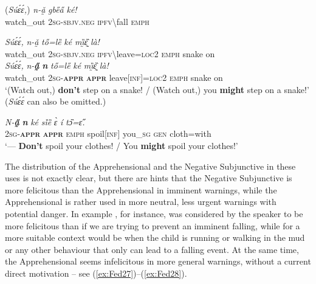 \documentclass[output=paper,colorlinks,citecolor=brown
]{langscibook}
\begin{document}
\ea \label{ex:Fed24}
\ea \label{ex:Fed24a}
\gll \textup{(}\textit{Súɛ́ɛ́,}\textup{)} \textit{n-ǎ̰} \textit{gbe̋a̋} \textit{ké!} \\
watch\_out \textsc{2sg-sbjv.neg} \textsc{ipfv}\backslash fall \textsc{emph} \\
\z
\z


\ea \label{ex:Fed25}
\ea \label{ex:Fed25a}
\gll \textit{Súɛ́ɛ́,} \textit{n-ǎ̰} \textit{tő=lȅ} \textit{ké} \textit{mı̰̏ɛ̰̏} \textit{là!} \\
watch\_out \textsc{2sg-sbjv.neg} \textsc{ipfv}\backslash leave=\textsc{loc2} \textsc{emph} snake on \\
\ex \label{ex:Fed25b}
\gll \textit{Súɛ́ɛ́,} \textit{n-\textbf{a̰̋}} \textit{\textbf{n{\ù}}} \textit{tő=le̋} \textit{ké} \textit{mı̰̏ɛ̰̏} \textit{là!} \\
watch\_out \textsc{2sg-\textbf{appr}} \textsc{\textbf{appr}} leave\textsc{[inf]=loc2} \textsc{emph} snake on \\
\glt `(Watch out,) \textbf{don't} step on a snake! / (Watch out,) you \textbf{might} step on a snake!' (\textit{Súɛ́ɛ́} can also be omitted.)
\z
\z



\ea \label{ex:Fed26}
\gll \textit{N-\textbf{a̰̋}} \textit{\textbf{n{\ù}}} \textit{ké} \textit{sȉȅ} \textit{ɛ̀} \textit{í} \textit{tɔ̏=ɛ̋.} \\
\textsc{2sg-\textbf{appr}} \textsc{\textbf{appr}} \textsc{emph} spoil[\textsc{inf}] you\_\textsc{sg} \textsc{gen} cloth=with \\
 `--- \textbf{Don't} spoil your clothes! / You \textbf{might} spoil your clothes!'
\z

 The distribution of the Apprehensional and the Negative Subjunctive in these uses is not exactly clear, but there are hints that the Negative Subjunctive is more felicitous than the Apprehensional in imminent warnings, while the Apprehensional is rather used in more neutral, less urgent warnings with potential danger. In example , for instance,  was considered by the speaker to be more felicitous than  if we are trying to prevent an imminent falling, while for  a more suitable context would be when the child is running or walking in the mud or any other behaviour that only can lead to a falling event. At the same time, the Apprehensional seems infelicitous in more general warnings, without a current direct motivation -- see (\ref{ex:Fed27})--(\ref{ex:Fed28}).
\end{document}
